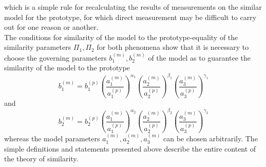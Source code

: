 	which is a simple rule for recalculating the results of measurements on the similar model for the prototype, for which direct measurement may be difficult to carry out for one reason or another.\\
	The conditions for similarity of the model to the prototype-equality of the similarity parameters $\Pi_1, \Pi_2$ for both phenomena show that it is necessary to choose the governing parameters $b_1^{(m)}, b_2^{(m)}$ of the model as to guarantee the similarity of the model to the prototype
	\begin{equation}
		b_1^{(m)} = b_1^{(p)} \left(\frac{a_1^{(m)}}{a_1^{(p)}}\right)^{\alpha_1}
		\left(\frac{a_2^{(m)}}{a_2^{(p)}}\right)^{\beta_1}
		\left(\frac{a_3^{(m)}}{a_3^{(p)}}\right)^{\gamma_1}
	\end{equation}
	and 
		\begin{equation}
	b_2^{(m)} = b_2^{(p)} \left(\frac{a_1^{(m)}}{a_1^{(p)}}\right)^{\alpha_2}
	\left(\frac{a_2^{(m)}}{a_2^{(p)}}\right)^{\beta_2}
	\left(\frac{a_3^{(m)}}{a_3^{(p)}}\right)^{\gamma_2}
	\end{equation}
	whereas the model parameters $a_1^{(m)}, a_2^{(m)}, a_3^{(m)}$ can be chosen arbitrarily. The simple definitions and statements presented above describe the entire content of the theory of similarity.
